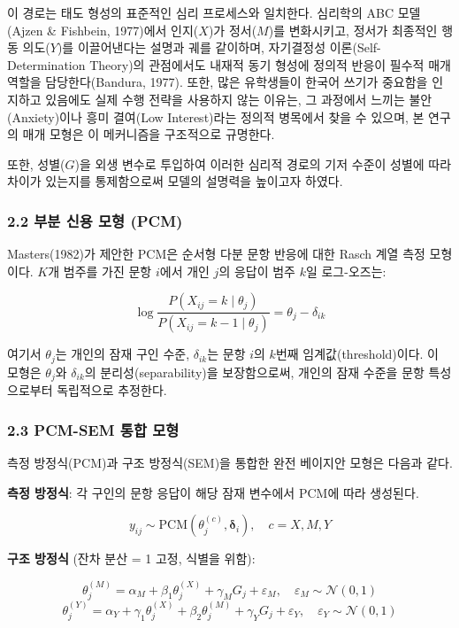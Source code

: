 \documentclass[a4paper,10pt]{oblivoir}
\begin{document}
이 경로는 태도 형성의 표준적인 심리 프로세스와 일치한다. 심리학의 ABC 모델(Ajzen \& Fishbein, 1977)에서 인지($X$)가 정서($M$)를 변화시키고, 정서가 최종적인 행동 의도($Y$)를 이끌어낸다는 설명과 궤를 같이하며, 자기결정성 이론(Self-Determination Theory)의 관점에서도 내재적 동기 형성에 정의적 반응이 필수적 매개 역할을 담당한다(Bandura, 1977). 또한, 많은 유학생들이 한국어 쓰기가 중요함을 인지하고 있음에도 실제 수행 전략을 사용하지 않는 이유는, 그 과정에서 느끼는 불안(Anxiety)이나 흥미 결여(Low Interest)라는 정의적 병목에서 찾을 수 있으며, 본 연구의 매개 모형은 이 메커니즘을 구조적으로 규명한다.

또한, 성별($G$)을 외생 변수로 투입하여 이러한 심리적 경로의 기저 수준이 성별에 따라 차이가 있는지를 통제함으로써 모델의 설명력을 높이고자 하였다.

\subsubsection{2.2 부분 신용 모형 (PCM)}

Masters(1982)가 제안한 PCM은 순서형 다분 문항 반응에 대한 Rasch 계열 측정 모형이다. $K$개 범주를 가진 문항 $i$에서 개인 $j$의 응답이 범주 $k$일 로그-오즈는:

\[ \log \frac{P(X_{ij} = k \mid \theta_j)}{P(X_{ij} = k-1 \mid \theta_j)} = \theta_j - \delta_{ik} \]

여기서 $\theta_j$는 개인의 잠재 구인 수준, $\delta_{ik}$는 문항 $i$의 $k$번째 임계값(threshold)이다. 이 모형은 $\theta_j$와 $\delta_{ik}$의 분리성(separability)을 보장함으로써, 개인의 잠재 수준을 문항 특성으로부터 독립적으로 추정한다.

\subsubsection{2.3 PCM-SEM 통합 모형}

측정 방정식(PCM)과 구조 방정식(SEM)을 통합한 완전 베이지안 모형은 다음과 같다.

\textbf{측정 방정식}: 각 구인의 문항 응답이 해당 잠재 변수에서 PCM에 따라 생성된다.

\[ y_{ij} \sim \text{PCM}(\theta_j^{(c)}, \boldsymbol{\delta}_i), \quad c = X, M, Y \]

\textbf{구조 방정식} (잔차 분산 = 1 고정, 식별을 위함):

\[ \theta_j^{(M)} = \alpha_M + \beta_1 \theta_j^{(X)} + \gamma_M G_j + \varepsilon_M, \quad \varepsilon_M \sim \mathcal{N}(0, 1) \]
\[ \theta_j^{(Y)} = \alpha_Y + \gamma_1 \theta_j^{(X)} + \beta_2 \theta_j^{(M)} + \gamma_Y G_j + \varepsilon_Y, \quad \varepsilon_Y \sim \mathcal{N}(0, 1) \]
\end{document}
